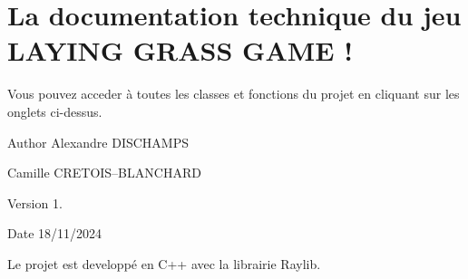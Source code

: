 \chapter{La documentation technique du jeu LAYING GRASS GAME !}
\hypertarget{index}{}\label{index}
Vous pouvez acceder à toutes les classes et fonctions du projet en cliquant sur les onglets ci-\/dessus. \begin{DoxyAuthor}{Author}
Alexandre DISCHAMPS 

Camille CRETOIS--BLANCHARD 
\end{DoxyAuthor}
\begin{DoxyVersion}{Version}
1. 
\end{DoxyVersion}
\begin{DoxyDate}{Date}
18/11/2024
\end{DoxyDate}
Le projet est developpé en C++ avec la librairie Raylib. 